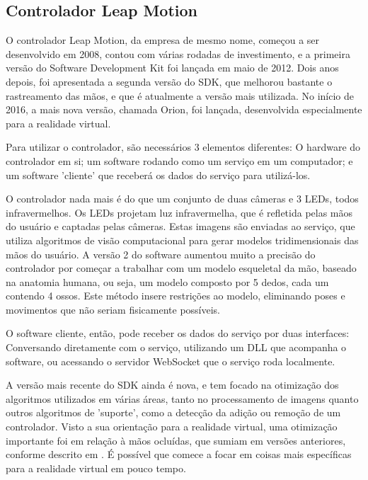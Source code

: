 \subsection{Controlador Leap Motion}\label{subsubsec-teo-leap-motion}

O controlador Leap Motion, da empresa de mesmo nome, começou a ser desenvolvido em 2008, contou com várias rodadas de investimento, e a primeira versão do Software Development Kit foi lançada em maio de 2012. Dois anos depois, foi apresentada a segunda versão do SDK, que melhorou bastante o rastreamento das mãos, e que é atualmente a versão mais utilizada. No início de 2016, a mais nova versão, chamada Orion, foi lançada, desenvolvida especialmente para a realidade virtual.

Para utilizar o controlador, são necessários 3 elementos diferentes: O hardware do controlador em si; um software rodando como um serviço em um computador; e um software 'cliente' que receberá os dados do serviço para utilizá-los.


O controlador nada mais é do que um conjunto de duas câmeras e 3 LEDs, todos infravermelhos. Os LEDs projetam luz infravermelha, que é refletida pelas mãos do usuário e captadas pelas câmeras. Estas imagens são enviadas ao serviço, que utiliza algoritmos de visão computacional para gerar modelos tridimensionais das mãos do usuário. A versão 2 do software aumentou muito a precisão do controlador por começar a trabalhar com um modelo esqueletal da mão, baseado na anatomia humana, ou seja, um modelo composto por 5 dedos, cada um contendo 4 ossos. Este método insere restrições ao modelo, eliminando poses e movimentos que não seriam fisicamente possíveis.

O software cliente, então, pode receber os dados do serviço por duas interfaces: Conversando diretamente com o serviço, utilizando um DLL que acompanha o software, ou acessando o servidor WebSocket que o serviço roda localmente.

A versão mais recente do SDK ainda é nova, e tem focado na otimização dos algoritmos utilizados em várias áreas, tanto no processamento de imagens quanto outros algoritmos de 'suporte', como a detecção da adição ou remoção de um controlador. Visto a sua orientação para a realidade virtual, uma otimização importante foi em relação à mãos ocluídas, que sumiam em versões anteriores, conforme descrito em \cite{leap:2016:changeset}. É possível que comece a focar em coisas mais específicas para a realidade virtual em pouco tempo.

